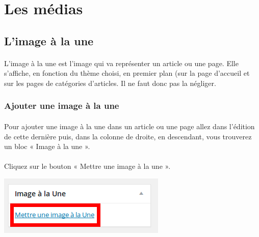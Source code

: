 \documentclass[10pt,a4paper]{article}
\begin{document}
\section{Les médias}
\subsection{L'image à la une}
\paragraph{}L'image à la une est l'image qui va représenter un article ou une page. Elle s'affiche, en fonction du thème choisi, en premier plan (sur la page d'accueil et sur les pages de catégories d'articles. Il ne faut donc pas la négliger.
\subsubsection{Ajouter une image à la une}
\paragraph{}Pour ajouter une image à la une dans un article ou une page allez dans l'édition de cette dernière puis, dans la colonne de droite, en descendant, vous trouverez un bloc « Image à la une ».
\paragraph{}Cliquez sur le bouton « Mettre une image à la une ».
\begin{center}
\includegraphics[scale=0.3]{img/0098.png}
\end{center}
\end{document}
